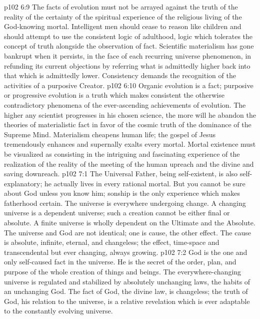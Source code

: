 \vs p102 6:9 The facts of evolution must not be arrayed against the truth of the reality of the certainty of the spiritual experience of the religious living of the God\hyp{}knowing mortal. Intelligent men should cease to reason like children and should attempt to use the consistent logic of adulthood, logic which tolerates the concept of truth alongside the observation of fact. Scientific materialism has gone bankrupt when it persists, in the face of each recurring universe phenomenon, in refunding its current objections by referring what is admittedly higher back into that which is admittedly lower. Consistency demands the recognition of the activities of a purposive Creator.
\vs p102 6:10 Organic evolution is a fact; purposive or progressive evolution is a truth which makes consistent the otherwise contradictory phenomena of the ever\hyp{}ascending achievements of evolution. The higher any scientist progresses in his chosen science, the more will he abandon the theories of materialistic fact in favor of the cosmic truth of the dominance of the Supreme Mind. Materialism cheapens human life; the gospel of Jesus tremendously enhances and supernally exalts every mortal. Mortal existence must be visualized as consisting in the intriguing and fascinating experience of the realization of the reality of the meeting of the human upreach and the divine and saving downreach.
\vs p102 7:1 The Universal Father, being self\hyp{}existent, is also self\hyp{}explanatory; he actually lives in every rational mortal. But you cannot be sure about God unless you know him; sonship is the only experience which makes fatherhood certain. The universe is everywhere undergoing change. A changing universe is a dependent universe; such a creation cannot be either final or absolute. A finite universe is wholly dependent on the Ultimate and the Absolute. The universe and God are not identical; one is cause, the other effect. The cause is absolute, infinite, eternal, and changeless; the effect, time\hyp{}space and transcendental but ever changing, always growing.
\vs p102 7:2 God is the one and only self\hyp{}caused fact in the universe. He is the secret of the order, plan, and purpose of the whole creation of things and beings. The everywhere\hyp{}changing universe is regulated and stabilized by absolutely unchanging laws, the habits of an unchanging God. The fact of God, the divine law, is changeless; the truth of God, his relation to the universe, is a relative revelation which is ever adaptable to the constantly evolving universe.

